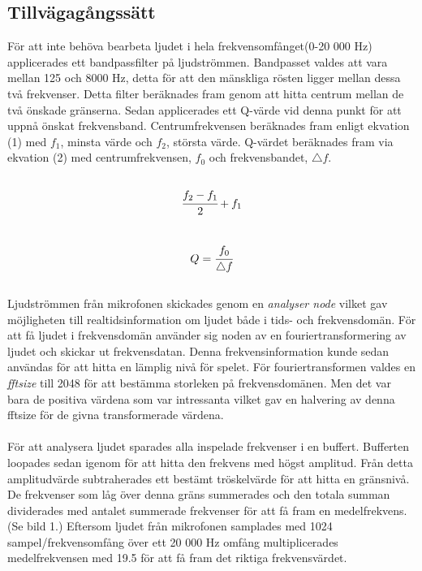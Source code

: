 \documentclass[12pt, titlepage, a4paper]{article}
\begin{document}
		\subsection{Tillvägagångssätt}
			För att inte behöva bearbeta ljudet i hela frekvensomfånget(0-20 000 Hz) applicerades ett bandpassfilter på ljudströmmen. Bandpasset valdes att vara mellan 125 och 8000 Hz, detta för att den mänskliga rösten ligger mellan dessa två frekvenser\cite{freq}. Detta filter beräknades fram genom att hitta centrum mellan de två önskade gränserna. Sedan applicerades ett Q-värde vid denna punkt för att uppnå önskat frekvensband.\cite{biqf} Centrumfrekvensen beräknades fram enligt ekvation (1) med $f_1$, minsta värde och $f_2$, största värde. Q-värdet beräknades fram via ekvation (2) med centrumfrekvensen, $f_0$ och frekvensbandet, $\bigtriangleup f$.\cite{QFi}
			\\ \\
			\begin{equation}
				\cfrac{f_2 - f_1}{2} + f_1
			\end{equation}
			\\
			\begin{equation}
				Q = \cfrac{f_0}{\bigtriangleup f}
			\end{equation}
			\\
			Ljudströmmen från mikrofonen skickades genom en \textit{analyser node} vilket gav möjligheten till realtidsinformation om ljudet både i tids- och frekvensdomän. För att få ljudet i frekvensdomän använder sig noden av en fouriertransformering av ljudet och skickar ut frekvensdatan. Denna frekvensinformation kunde sedan användas för att hitta en lämplig nivå för spelet. För fouriertransformen valdes en \textit{fftsize} till 2048 för att bestämma storleken på frekvensdomänen. Men det var bara de positiva värdena som var intressanta vilket gav en halvering av denna fftsize för de givna transformerade värdena\cite{AnalyserNode}.
			\\ \\
			För att analysera ljudet sparades alla inspelade frekvenser i en buffert. Bufferten loopades sedan igenom för att hitta den frekvens med högst amplitud. Från detta amplitudvärde subtraherades ett bestämt tröskelvärde för att hitta en gränsnivå. De frekvenser som låg över denna gräns summerades och den totala summan dividerades med antalet summerade frekvenser för att få fram en medelfrekvens. (Se bild 1.) Eftersom ljudet från mikrofonen samplades med 1024 sampel/frekvensomfång över ett 20 000 Hz omfång multiplicerades medelfrekvensen med 19.5 för att få fram det riktiga frekvensvärdet.
\end{document}

